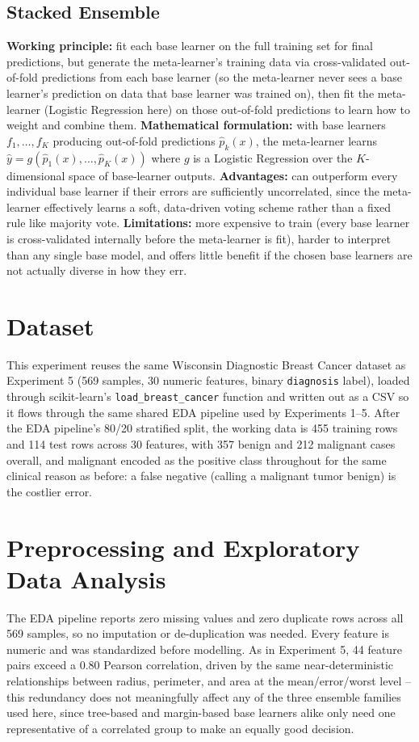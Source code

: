 \documentclass[11pt,a4paper]{article}
\begin{document}
\subsection{Stacked Ensemble}
\textbf{Working principle:} fit each base learner on the full training set for final predictions, but generate the meta-learner's training data via cross-validated out-of-fold predictions from each base learner (so the meta-learner never sees a base learner's prediction on data that base learner was trained on), then fit the meta-learner (Logistic Regression here) on those out-of-fold predictions to learn how to weight and combine them.
\textbf{Mathematical formulation:} with base learners $f_1,\dots,f_K$ producing out-of-fold predictions $\hat p_k(x)$, the meta-learner learns $\hat y = g(\hat p_1(x),\dots,\hat p_K(x))$ where $g$ is a Logistic Regression over the $K$-dimensional space of base-learner outputs.
\textbf{Advantages:} can outperform every individual base learner if their errors are sufficiently uncorrelated, since the meta-learner effectively learns a soft, data-driven voting scheme rather than a fixed rule like majority vote.
\textbf{Limitations:} more expensive to train (every base learner is cross-validated internally before the meta-learner is fit), harder to interpret than any single base model, and offers little benefit if the chosen base learners are not actually diverse in how they err.

\section{Dataset}
This experiment reuses the same Wisconsin Diagnostic Breast Cancer dataset as Experiment 5 (569 samples, 30 numeric features, binary \texttt{diagnosis} label), loaded through scikit-learn's \texttt{load\_breast\_cancer} function and written out as a CSV so it flows through the same shared EDA pipeline used by Experiments 1--5. After the EDA pipeline's 80/20 stratified split, the working data is 455 training rows and 114 test rows across 30 features, with 357 benign and 212 malignant cases overall, and malignant encoded as the positive class throughout for the same clinical reason as before: a false negative (calling a malignant tumor benign) is the costlier error.

\section{Preprocessing and Exploratory Data Analysis}
The EDA pipeline reports zero missing values and zero duplicate rows across all 569 samples, so no imputation or de-duplication was needed. Every feature is numeric and was standardized before modelling. As in Experiment 5, 44 feature pairs exceed a 0.80 Pearson correlation, driven by the same near-deterministic relationships between radius, perimeter, and area at the mean/error/worst level -- this redundancy does not meaningfully affect any of the three ensemble families used here, since tree-based and margin-based base learners alike only need one representative of a correlated group to make an equally good decision.
\end{document}
